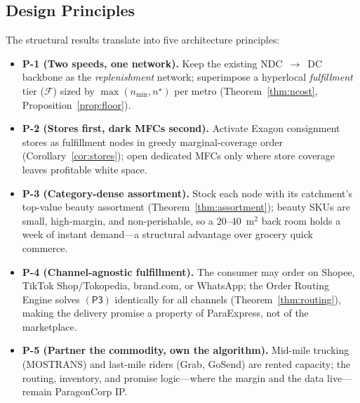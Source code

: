 \documentclass[journal]{IEEEtran}
\begin{document}
\subsection{Design Principles}
The structural results translate into five architecture principles:
\begin{itemize}[leftmargin=*]
  \item \textbf{P-1 (Two speeds, one network).} Keep the existing NDC~$\to$~DC backbone as the \emph{replenishment} network; superimpose a hyperlocal \emph{fulfillment} tier ($\mathcal{F}$) sized by $\max(n_{\min}, n^\star)$ per metro (Theorem~\ref{thm:ncost}, Proposition~\ref{prop:floor}).
  \item \textbf{P-2 (Stores first, dark MFCs second).} Activate Exagon consignment stores as fulfillment nodes in greedy marginal-coverage order (Corollary~\ref{cor:stores}); open dedicated MFCs only where store coverage leaves profitable white space.
  \item \textbf{P-3 (Category-dense assortment).} Stock each node with its catchment's top-value beauty assortment (Theorem~\ref{thm:assortment}); beauty SKUs are small, high-margin, and non-perishable, so a 20--40~m$^2$ back room holds a week of instant demand---a structural advantage over grocery quick commerce.
  \item \textbf{P-4 (Channel-agnostic fulfillment).} The consumer may order on Shopee, TikTok Shop/Tokopedia, brand.com, or WhatsApp; the Order Routing Engine solves $(\mathsf{P3})$ identically for all channels (Theorem~\ref{thm:routing}), making the delivery promise a property of ParaExpress, not of the marketplace.
  \item \textbf{P-5 (Partner the commodity, own the algorithm).} Mid-mile trucking (MOSTRANS) and last-mile riders (Grab, GoSend) are rented capacity; the routing, inventory, and promise logic---where the margin and the data live---remain ParagonCorp IP.
\end{itemize}
\end{document}
